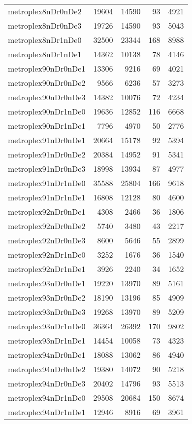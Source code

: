 \begin{tabular}{lrrrr}
metroplex8nDr0nDe2 & 19604 & 14590 & 93 & 4921 \\
metroplex8nDr0nDe3 & 19726 & 14590 & 93 & 5043 \\
metroplex8nDr1nDe0 & 32500 & 23344 & 168 & 8988 \\
metroplex8nDr1nDe1 & 14362 & 10138 & 78 & 4146 \\
metroplex90nDr0nDe1 & 13306 & 9216 & 69 & 4021 \\
metroplex90nDr0nDe2 & 9566 & 6236 & 57 & 3273 \\
metroplex90nDr0nDe3 & 14382 & 10076 & 72 & 4234 \\
metroplex90nDr1nDe0 & 19636 & 12852 & 116 & 6668 \\
metroplex90nDr1nDe1 & 7796 & 4970 & 50 & 2776 \\
metroplex91nDr0nDe1 & 20664 & 15178 & 92 & 5394 \\
metroplex91nDr0nDe2 & 20384 & 14952 & 91 & 5341 \\
metroplex91nDr0nDe3 & 18998 & 13934 & 87 & 4977 \\
metroplex91nDr1nDe0 & 35588 & 25804 & 166 & 9618 \\
metroplex91nDr1nDe1 & 16808 & 12128 & 80 & 4600 \\
metroplex92nDr0nDe1 & 4308 & 2466 & 36 & 1806 \\
metroplex92nDr0nDe2 & 5740 & 3480 & 43 & 2217 \\
metroplex92nDr0nDe3 & 8600 & 5646 & 55 & 2899 \\
metroplex92nDr1nDe0 & 3252 & 1676 & 36 & 1540 \\
metroplex92nDr1nDe1 & 3926 & 2240 & 34 & 1652 \\
metroplex93nDr0nDe1 & 19220 & 13970 & 89 & 5161 \\
metroplex93nDr0nDe2 & 18190 & 13196 & 85 & 4909 \\
metroplex93nDr0nDe3 & 19268 & 13970 & 89 & 5209 \\
metroplex93nDr1nDe0 & 36364 & 26392 & 170 & 9802 \\
metroplex93nDr1nDe1 & 14454 & 10058 & 73 & 4323 \\
metroplex94nDr0nDe1 & 18088 & 13062 & 86 & 4940 \\
metroplex94nDr0nDe2 & 19380 & 14072 & 90 & 5218 \\
metroplex94nDr0nDe3 & 20402 & 14796 & 93 & 5513 \\
metroplex94nDr1nDe0 & 29508 & 20684 & 150 & 8674 \\
metroplex94nDr1nDe1 & 12946 & 8916 & 69 & 3961 \\

\end{tabular}
